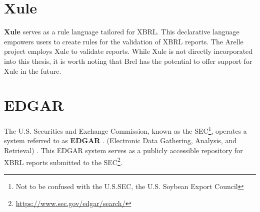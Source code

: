 \section{Xule}
\textcolor{tropicalrainforest}{\textbf{Xule}}\cite{xule} 
serves as a rule language tailored for XBRL. 
This declarative language empowers users to create rules for the validation of XBRL reports. 
The Arelle project employs Xule to validate reports. 
While Xule is not directly incorporated into this thesis, it is worth noting that Brel has the potential to offer support for Xule in the future.


\section{EDGAR}
\label{sec:edgar}
The U.S. Securities and Exchange Commission, known as the SEC\footnote{Not to be confused with the U.S.SEC, the U.S. Soybean Export Council},
operates a system referred to as 
\textcolor{tropicalrainforest}{\textbf{EDGAR}} \cite{sec_edgar}. 
(Electronic Data Gathering, Analysis, and Retrieval) \cite{sec_edgar}. 
This EDGAR system serves as a publicly accessible repository for XBRL reports submitted to the SEC\footnote{\url{https://www.sec.gov/edgar/search/}}.

